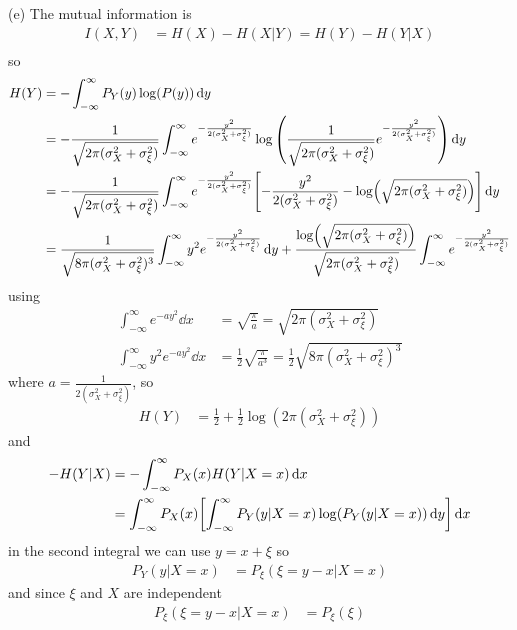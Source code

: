 \documentclass[../main.tex]{subfiles}
\begin{document}
(e) The mutual information is
\begin{align*}
    I(X,Y) &= H(X) - H(X|Y) = H(Y) - H(Y|X) \\
\end{align*}
so
\begin{align*}
    H(Y) &= -\int_{-\infty}^\infty P_Y(y) \log(P(y)) \dd{y} \\
        &= -\frac{1}{\sqrt{2\pi(\sigma_X^2 + \sigma_\xi^2)}} \int_{-\infty}^\infty e^{-\frac{y^2}{2(\sigma_X^2 + \sigma_\xi^2)}} 
            \log\qt(\frac{1}{\sqrt{2\pi(\sigma_X^2 + \sigma_\xi^2)}} e^{-\frac{y^2}{2(\sigma_X^2 + \sigma_\xi^2)}}) \dd{y} \\
        &= -\frac{1}{\sqrt{2\pi(\sigma_X^2 + \sigma_\xi^2)}} \int_{-\infty}^\infty e^{-\frac{y^2}{2(\sigma_X^2 + \sigma_\xi^2)}} 
            \qt[-\frac{y^2}{2(\sigma_X^2 + \sigma_\xi^2)} - \log(\sqrt{2\pi(\sigma_X^2 + \sigma_\xi^2)})] \dd{y} \\
        &= \frac{1}{\sqrt{8\pi(\sigma_X^2 + \sigma_\xi^2)^3}} \int_{-\infty}^\infty y^2 e^{-\frac{y^2}{2(\sigma_X^2 + \sigma_\xi^2)}} \dd{y}
            + \frac{\log(\sqrt{2\pi(\sigma_X^2 + \sigma_\xi^2)})}{\sqrt{2\pi(\sigma_X^2 + \sigma_\xi^2)}} 
            \int_{-\infty}^\infty e^{-\frac{y^2}{2(\sigma_X^2 + \sigma_\xi^2)}}
\end{align*}
using 
\begin{align*}
    \int_{-\infty}^\infty e^{-ay^2} \dd{x} &= \sqrt{\frac{\pi}{a}} = \sqrt{2\pi(\sigma_X^2 + \sigma_\xi^2)}\\
    \int_{-\infty}^\infty y^2 e^{-ay^2} \dd{x} &= \frac{1}{2} \sqrt{\frac{\pi}{a^3}} = \frac{1}{2} \sqrt{8\pi(\sigma_X^2 + \sigma_\xi^2)^3}
\end{align*}
where $a = \frac{1}{2(\sigma_X^2 + \sigma_\xi^2)}$, so
\begin{align*}
    H(Y) &= \frac{1}{2} + \frac{1}{2} \log(2\pi(\sigma_X^2 + \sigma_\xi^2)) 
\end{align*}
and 
\begin{align*}
    -H(Y|X) &= -\int_{-\infty}^\infty P_X(x) H(Y|X = x) \dd{x} \\
    &= \int_{-\infty}^\infty P_X(x) \qt[\int_{-\infty}^\infty P_Y(y|X = x) \log(P_Y(y|X = x)) \dd{y}] \dd{x}
\end{align*}
in the second integral we can use $y = x + \xi$ so
\begin{align*}
    P_Y(y|X = x) &= P_\xi(\xi = y - x | X = x)
\end{align*}
and since $\xi$ and $X$ are independent
\begin{align*}
    P_\xi(\xi = y - x | X = x) &= P_\xi(\xi)
\end{align*}
\end{document}
